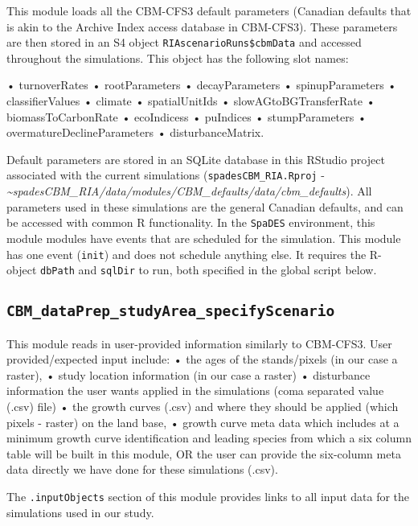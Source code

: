 \documentclass[
]{article}
\begin{document}
This module loads all the CBM-CFS3 default parameters (Canadian defaults
that is akin to the Archive Index access database in CBM-CFS3). These
parameters are then stored in an S4 object
\texttt{RIAscenarioRuns\$cbmData} and accessed throughout the
simulations. This object has the following slot names:

• turnoverRates • rootParameters • decayParameters • spinupParameters •
classifierValues • climate • spatialUnitIds • slowAGtoBGTransferRate •
biomassToCarbonRate • ecoIndicess • puIndices • stumpParameters •
overmatureDeclineParameters • disturbanceMatrix.

Default parameters are stored in an SQLite database in this RStudio
project associated with the current simulations
(\texttt{spadesCBM\_RIA.Rproj} -
\emph{\textasciitilde spadesCBM\_RIA/data/modules/CBM\_defaults/data/cbm\_defaults}).
All parameters used in these simulations are the general Canadian
defaults, and can be accessed with common R functionality. In the
\texttt{SpaDES} environment, this module modules have events that are
scheduled for the simulation. This module has one event (\texttt{init})
and does not schedule anything else. It requires the R-object
\texttt{dbPath} and \texttt{sqlDir} to run, both specified in the global
script below.

\hypertarget{cbm_dataprep_studyarea_specifyscenario}{%
\subsection{\texorpdfstring{\texttt{CBM\_dataPrep\_studyArea\_specifyScenario}}{CBM\_dataPrep\_studyArea\_specifyScenario}}\label{cbm_dataprep_studyarea_specifyscenario}}

This module reads in user-provided information similarly to CBM-CFS3.
User provided/expected input include: • the ages of the stands/pixels
(in our case a raster), • study location information (in our case a
raster) • disturbance information the user wants applied in the
simulations (coma separated value (.csv) file) • the growth curves
(.csv) and where they should be applied (which pixels - raster) on the
land base, • growth curve meta data which includes at a minimum growth
curve identification and leading species from which a six column table
will be built in this module, OR the user can provide the six-column
meta data directly we have done for these simulations (.csv).

The \texttt{.inputObjects} section of this module provides links to all
input data for the simulations used in our study.
\end{document}
